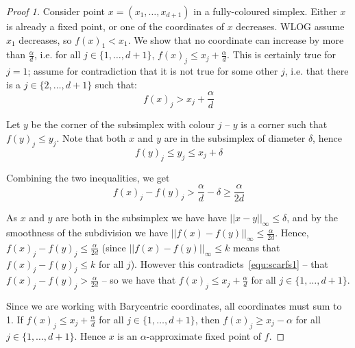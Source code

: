 \begin{proof}[Proof 1]
	Consider point $x=(x_1, \ldots, x_{d+1})$ in a fully-coloured simplex.
	Either $x$ is already a fixed point, or one of the coordinates of $x$
	decreases.  WLOG assume $x_1$ decreases, so $f(x)_1 < x_1$. We show that no
	coordinate can increase by more than $\frac{\alpha}{d}$, i.e. for all $j
	\in \{1, \ldots, d+1 \}$, $f(x)_j \le x_j + \frac{\alpha}{d}$. This is
	certainly true for $j=1$; assume for contradiction that it is not true for
	some other $j$, i.e. that there is a $j \in \{2,\ldots,d+1\}$ such that:
	\begin{equation*}
		f(x)_j > x_j + \frac{\alpha}{d}
	\end{equation*}

	Let $y$ be the corner of the subsimplex with colour $j$ -- $y$ is a corner
	such that $f(y)_j \le y_j$. Note that both $x$ and $y$ are in the
	subsimplex of diameter $\delta$, hence
	\begin{equation*}
		f(y)_j \le y_j \le x_j + \delta
	\end{equation*}

	Combining the two inequalities, we get
	\begin{equation}
		\label{equ:scarfs1}
		f(x)_j - f(y)_j > \frac{\alpha}{d} - \delta \ge \frac{\alpha}{2d}
	\end{equation}

	As $x$ and $y$ are both in the subsimplex we have have $||x-y||_\infty \le
	\delta$, and by the smoothness of the subdivision we have
	$||f(x)-f(y)||_\infty \le \frac{\alpha}{2d}$. Hence, $f(x)_j - f(y)_j \le
	\frac{\alpha}{2d}$ (since $||f(x)-f(y)||_\infty \le k$ means that $f(x)_j -
	f(y)_j \le k$ for all $j$).  However this contradicts~\eqref{equ:scarfs1}
	-- that $f(x)_j - f(y)_j > \frac{\alpha}{2d}$ -- so we have that $f(x)_j
	\le x_j + \frac{\alpha}{d}$ for all $j \in \{1,\ldots,d+1\}$.

	Since we are working with Barycentric coordinates, all coordinates must sum
	to 1. If $f(x)_j \le x_j + \frac{\alpha}{d}$ for all $j \in
	\{1,\ldots,d+1\}$, then $f(x)_j \ge x_j - \alpha$ for all $j \in
	\{1,\ldots,d+1\}$. Hence $x$ is an $\alpha$-approximate fixed point of $f$.
\end{proof}

